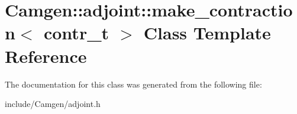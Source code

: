\hypertarget{a00341}{}\section{Camgen\+:\+:adjoint\+:\+:make\+\_\+contraction$<$ contr\+\_\+t $>$ Class Template Reference}
\label{a00341}


The documentation for this class was generated from the following file\+:\begin{DoxyCompactItemize}
\item 
include/\+Camgen/adjoint.\+h\end{DoxyCompactItemize}
